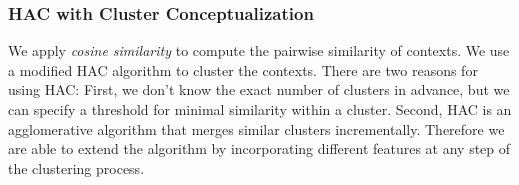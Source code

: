 \subsubsection{HAC with Cluster Conceptualization}
We apply \emph{cosine similarity} to compute
the pairwise similarity of contexts.
We use a modified HAC algorithm to cluster the contexts.
There are two reasons for using HAC:
First, we don't know the exact number of clusters in advance, but we can
specify a threshold for minimal similarity within a cluster.
Second, HAC is an agglomerative algorithm that merges similar clusters
incrementally. Therefore we are able to extend the algorithm
by incorporating different features at any step of the clustering process.

